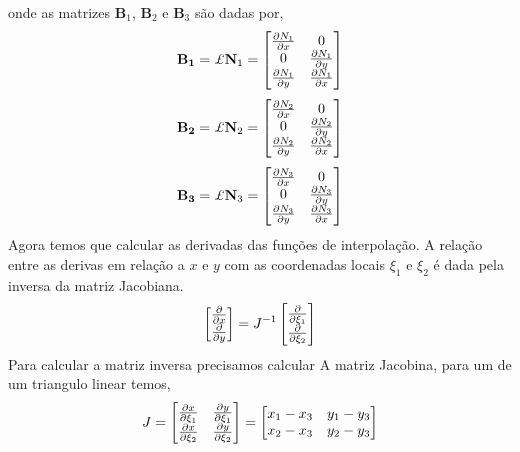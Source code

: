onde as matrizes $\mathbf{B}_1$, $\mathbf{B}_2$ e $\mathbf{B}_3$ são dadas por,
%
\begin{equation}
	\mathbf{B_1} = \pounds \mathbf{N}_1 = 
	\begin{bmatrix}
		\mdp{N_1}{x}& 0\\
    	           0& \mdp{N_1}{y}\\
		\mdp{N_1}{y}& \mdp{N_1}{x}
	\end{bmatrix}
\end{equation}
%
\begin{equation}
	\mathbf{B_2} = \pounds \mathbf{N}_2 = 
	\begin{bmatrix}
		\mdp{N_2}{x}& 0\\
		0& \mdp{N_2}{y}\\
		\mdp{N_2}{y}& \mdp{N_2}{x}
	\end{bmatrix}
\end{equation}
%
\begin{equation}
	\mathbf{B_3} = \pounds \mathbf{N}_3 = 
	\begin{bmatrix}
		\mdp{N_3}{x}& 0\\
		0& \mdp{N_3}{y}\\
		\mdp{N_3}{y}& \mdp{N_3}{x}
	\end{bmatrix}
\end{equation}
%
Agora temos que calcular as derivadas das funções de interpolação. A relação entre as derivas em relação a $x$ e $y$ com as coordenadas locais $\xi_1$ e $\xi_2$ é dada pela inversa da matriz Jacobiana.
%
\begin{equation}
	\begin{bmatrix}
		\frac{\partial }{\partial x}\\
		\frac{\partial }{\partial y}
	\end{bmatrix} = J^{-1} 
	\begin{bmatrix}
	\frac{\partial }{\partial \xi_1}\\
	\frac{\partial }{\partial \xi_2}	
	\end{bmatrix}
	\label{provas:derivada_jacobiano}
\end{equation}
%
Para calcular a matriz inversa precisamos calcular A matriz Jacobina, para um de um triangulo linear temos,
%
\begin{equation}
J =	\begin{bmatrix}
		\frac{\partial x}{\partial \xi_1}&\frac{\partial y}{\partial \xi_1}\\
		\frac{\partial x}{\partial \xi_2}&\frac{\partial y}{\partial \xi_2}
	\end{bmatrix} =
    \begin{bmatrix}
  		x_1 - x_3&y_1 - y_3\\
	  	x_2 - x_3&y_2 - y_3
    \end{bmatrix} 
\end{equation}
